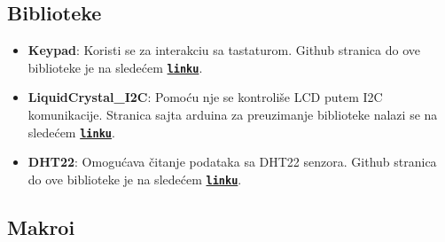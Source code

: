 \documentclass[a4paper, 12pt]{article}
\begin{document}
	\subsection{Biblioteke}
	\begin{itemize}
    		\item \textbf{Keypad}: Koristi se za interakciu sa tastaturom. Github stranica do ove biblioteke je na sledećem \textbf{\texttt{\href{https://github.com/Chris--A/Keypad.git}{linku}}}.
    		
    		\item \textbf{LiquidCrystal\_I2C}: Pomoću nje se kontroliše LCD putem I2C komunikacije. Stranica sajta arduina za preuzimanje biblioteke nalazi se na sledećem \textbf{\texttt{\href{https://downloads.arduino.cc/libraries/github.com/marcoschwartz/LiquidCrystal_I2C-1.1.2.zip}{linku}}}. 
    		
    		\item \textbf{DHT22}: Omogućava čitanje podataka sa DHT22 senzora. Github stranica do ove biblioteke je na sledećem \textbf{\texttt{\href{https://github.com/Chris--A/Keypad.git}{linku}}}.
	\end{itemize}

\newpage

	\subsection{Makroi}

\vspace{10pt}
\end{document}
